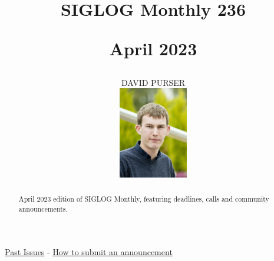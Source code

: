 \documentclass[prodmode,acmtecs]{acmsmall} %
\newcounter{colstart}
\begin{document}
\setcounter{colstart}{\thepage}

\title{{\huge\sc SIGLOG Monthly 236}

 April 2023}
\author{DAVID PURSER
\vspace*{-2.6cm}\begin{flushright}\includegraphics[width=30mm]{dp}\end{flushright}
}

\begin{abstract}
April 2023 edition of SIGLOG Monthly, featuring deadlines, calls and community announcements.
\end{abstract}


\maketitlee

\href{https://lics.siglog.org/newsletters/}{Past Issues}
 - 
\href{https://lics.siglog.org/newsletters/inst.html}{How to submit an announcement}
\end{document}
